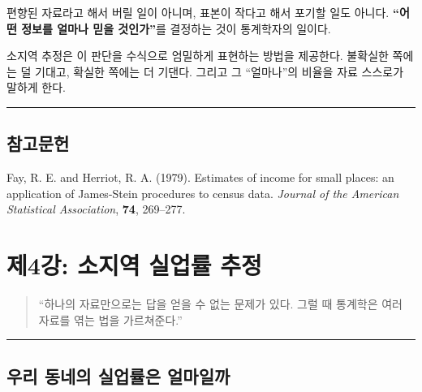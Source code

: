 \documentclass[
  letterpaper,
  DIV=11,
  numbers=noendperiod]{scrreprt}
\begin{document}
\begin{tcolorbox}[enhanced jigsaw, arc=.35mm, bottomrule=.15mm, bottomtitle=1mm, breakable, colback=white, colbacktitle=quarto-callout-tip-color!10!white, colframe=quarto-callout-tip-color-frame, coltitle=black, left=2mm, leftrule=.75mm, opacityback=0, opacitybacktitle=0.6, rightrule=.15mm, title=\textcolor{quarto-callout-tip-color}{\faLightbulb}\hspace{0.5em}{통계학자의 관점}, titlerule=0mm, toprule=.15mm, toptitle=1mm]

편향된 자료라고 해서 버릴 일이 아니며, 표본이 작다고 해서 포기할 일도
아니다. \textbf{``어떤 정보를 얼마나 믿을 것인가''}를 결정하는 것이
통계학자의 일이다.

소지역 추정은 이 판단을 수식으로 엄밀하게 표현하는 방법을 제공한다.
불확실한 쪽에는 덜 기대고, 확실한 쪽에는 더 기댄다. 그리고 그
``얼마나''의 비율을 자료 스스로가 말하게 한다.

\end{tcolorbox}

\begin{center}\rule{0.5\linewidth}{0.5pt}\end{center}

\section{참고문헌}\label{uxcc38uxace0uxbb38uxd5cc-1}

Fay, R. E. and Herriot, R. A. (1979). Estimates of income for small
places: an application of James-Stein procedures to census data.
\emph{Journal of the American Statistical Association}, \textbf{74},
269--277.


\chapter{제4강: 소지역 실업률
추정}\label{uxc81c4uxac15-uxc18cuxc9c0uxc5ed-uxc2e4uxc5c5uxb960-uxcd94uxc815}

\begin{quote}
``하나의 자료만으로는 답을 얻을 수 없는 문제가 있다. 그럴 때 통계학은
여러 자료를 엮는 법을 가르쳐준다.''
\end{quote}

\begin{center}\rule{0.5\linewidth}{0.5pt}\end{center}

\section{우리 동네의 실업률은
얼마일까}\label{uxc6b0uxb9ac-uxb3d9uxb124uxc758-uxc2e4uxc5c5uxb960uxc740-uxc5bcuxb9c8uxc77cuxae4c}
\end{document}
